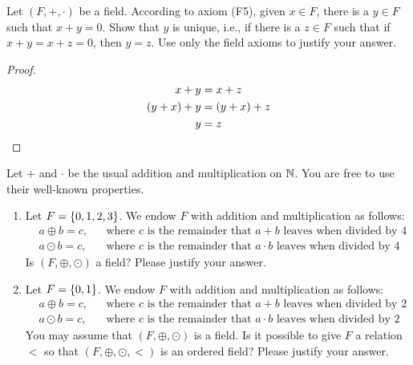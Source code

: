 \documentclass[12pt]{article}
\begin{document}
\begin{problem}
    Let $(F, +, \cdot)$ be a field.
    According to axiom (F5), given $x \in F$, there is a $y \in F$ such that $x + y = 0$.
    Show that $y$ is unique, i.e., if there is a $z \in F$ such that if $x + y = x + z = 0$, then $y = z$.
    Use only the field axioms to justify your answer.
\end{problem}
\begin{proof}
    \begin{align*}
        x + y &= x + z \\
        (y + x) + y &= (y + x) + z \\
        y &= z \qedhere
    \end{align*}
\end{proof}

\begin{problem}
    Let $+$ and $\cdot$ be the usual addition and multiplication on $\mathbb{N}$.
    You are free to use their well-known properties.
    \begin{enumerate}[label=(\alph*)]
        \item Let $F = \set{0, 1, 2, 3}$. We endow $F$ with addition and multiplication as follows:
        \begin{align*}
            & a \oplus b = c, && \text{where $c$ is the remainder that $a + b$ leaves when divided by 4} \\
            & a \odot b = c, && \text{where $c$ is the remainder that $a \cdot b$ leaves when divided by 4}
        \end{align*}
        Is $(F, \oplus, \odot)$ a field? Please justify your answer.

        \item Let $F = \set{0, 1}$. We endow $F$ with addition and multiplication as follows:
        \begin{align*}
            & a \oplus b = c, && \text{where $c$ is the remainder that $a + b$ leaves when divided by 2} \\
            & a \odot b = c, && \text{where $c$ is the remainder that $a \cdot b$ leaves when divided by 2}
        \end{align*}
        You may assume that $(F, \oplus, \odot)$ is a field. Is it possible to give $F$ a relation $<$ so that $(F, \oplus, \odot, <)$ is an ordered field? Please justify your answer.
    \end{enumerate}
\end{problem}
\end{document}
